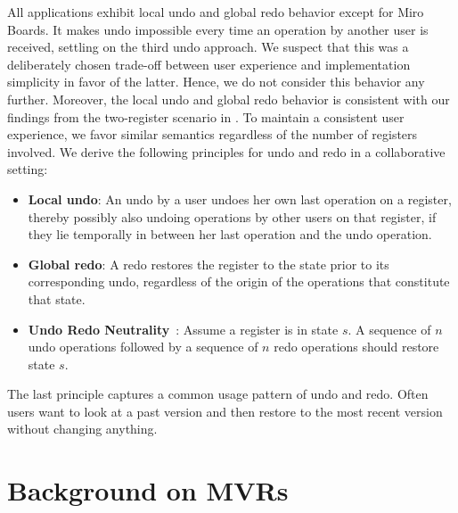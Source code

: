 \documentclass[sigplan,natbib=false,review]{acmart}
\begin{document}
All applications exhibit local undo and global redo behavior
except for Miro Boards.
It makes undo impossible every time an operation by another user is
received, settling on the third undo approach.
We suspect that this was a deliberately chosen trade-off between
user experience and implementation simplicity in favor of the latter.
Hence, we do not consider this behavior any further.
Moreover, the local undo and global redo behavior is consistent with our
findings from the two-register scenario in .
To maintain a consistent user experience, we favor similar semantics
regardless of the number of registers involved.
We derive the following principles for undo and redo in a collaborative
setting:

\begin{itemize}
  \item \textbf{Local undo}:
    An undo by a user undoes her own last operation on a register,
    thereby possibly also undoing operations by other users on that register,
    if they lie temporally in between her last operation and the undo operation.
  \item \textbf{Global redo}:
    A redo restores the register to the state prior to its corresponding undo,
    regardless of the origin of the operations that constitute that state.
  \item \textbf{Undo Redo Neutrality}~\cite{figma2019multiplayer}:
    Assume a register is in state $s$.
    A sequence of $n$ undo operations followed by a sequence of $n$ redo operations
    should restore state $s$.
\end{itemize}

The last principle captures a common usage pattern of undo and redo.
Often users want to look at a past version and then restore to the most
recent version without changing anything.



\section{Background on MVRs}\label{sec:background}
\end{document}

